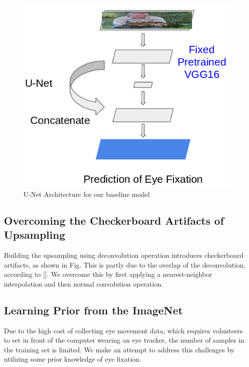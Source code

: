 \documentclass[10pt,twocolumn,letterpaper]{article}
\begin{document}
 \begin{figure}
	\begin{center}
		\includegraphics[width=\columnwidth]{figures/architecture_bl.png}
	\end{center}
	\caption{U-Net Architecture for our baseline model}
	\label{fig:unet}
\end{figure}

\subsection{Overcoming the Checkerboard Artifacts of Upsampling}
Building the upsampling using deconvolution operation introduces checkerboard artifacts, as shown in Fig. This is partly due to the overlap of the deconvolution, according to []. We overcome this by first applying a nearest-neighbor interpolation and then normal convolution operation.

\subsection{Learning Prior from the ImageNet}

 Due to the high cost of collecting eye movement data, which requires volunteers to set in front of the computer wearing an eye tracker, the number of samples in the training set is limited. We make an attempt to address this challenges by utilizing some prior knowledge of eye fixation.
 
\end{document}
